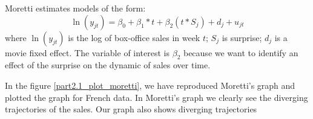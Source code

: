 Moretti estimates models of the form: \begin{equation}\label{key}
\ln(y_{jt})=\beta_0+\beta_1*t+\beta_2(t*S_j)+d_j+u_{jt}
\end{equation}
where $\ln(y_{jt})$ is the log of box-office sales in week $t$; $S_j$ is surprise; $d_j$ is a movie fixed effect. The variable of interest is $\beta_2$ because we want to identify an effect of the surprise on the dynamic of sales over time.


In the figure \ref{part2.1_plot_moretti}, we have reproduced Moretti's graph and plotted the graph for French data. In Moretti's graph we clearly see the diverging trajectories of the sales. Our graph also shows diverging trajectories


